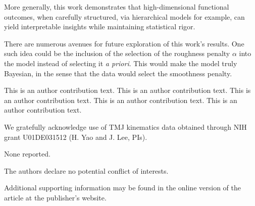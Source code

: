 \documentclass[AMA,Times1COL]{WileyNJDv5} %
\begin{document}
More generally, this work demonstrates that high-dimensional functional outcomes, when  carefully structured, via hierarchical models for example, can yield interpretable insights while maintaining statistical rigor.

There are numerous avenues for future exploration of this work's results.  One such idea could be the inclusion of the selection of the roughness penalty \(\alpha\) into the model instead of selecting it \emph{a priori}.  This would make the model truly Bayesian, in the sense that the data would select the smoothness penalty.  

{}

This is an author contribution text. This is an author contribution text. This is an author contribution text. This is an author contribution text. This is an author contribution text.

We gratefully acknowledge use of TMJ kinematics data obtained through NIH grant U01DE031512 (H. Yao and J. Lee, PIs). 



None reported.


The authors declare no potential conflict of interests.

%
%



Additional supporting information may be found in the
online version of the article at the publisher’s website.


\appendix

\end{document}
